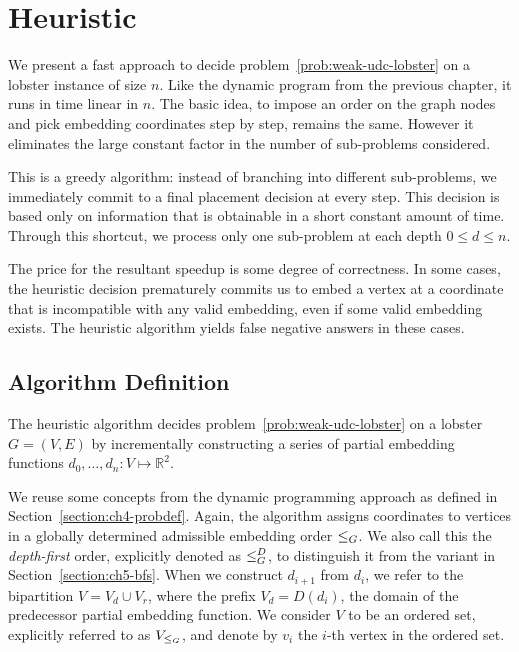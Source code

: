 \chapter{Heuristic}
\label{ch:heuristic}

We present a fast approach to decide problem~\ref{prob:weak-udc-lobster} on a lobster instance of size $n$. Like the dynamic program from the previous chapter, it runs in time linear in $n$. The basic idea, to impose an order on the graph nodes and pick embedding coordinates step by step, remains the same. However it eliminates the large constant factor in the number of sub-problems considered.

This is a greedy algorithm: instead of branching into different sub-problems, we immediately commit to a final placement decision at every step. This decision is based only on information that is obtainable in a short constant amount of time. Through this shortcut, we process only one sub-problem at each depth $0 \leq d \leq n$.

The price for the resultant speedup is some degree of correctness. In some cases, the heuristic decision prematurely commits us to embed a vertex at a coordinate that is incompatible with any valid embedding, even if some valid embedding exists. The heuristic algorithm yields false negative answers in these cases.

\section{Algorithm Definition}

The heuristic algorithm decides problem~\ref{prob:weak-udc-lobster} on a lobster $G = (V, E)$ by incrementally constructing a series of partial embedding functions $d_0, \ldots, d_n : V \mapsto \mathbb R^2$.

We reuse some concepts from the dynamic programming approach as defined in Section~\ref{section:ch4-probdef}. Again, the algorithm assigns coordinates to vertices in a globally determined admissible embedding order $\leq_G$. We also call this the \emph{depth-first} order, explicitly denoted as $\leq_G^D$, to distinguish it from the variant in Section~\ref{section:ch5-bfs}. When we construct $d_{i+1}$ from $d_i$, we refer to the bipartition $V = V_d \cup V_r$, where the prefix $V_d = D(d_i)$, the domain of the predecessor partial embedding function. We consider $V$ to be an ordered set, explicitly referred to as $V_{\leq_G}$, and denote by $v_i$ the $i$-th vertex in the ordered set.

